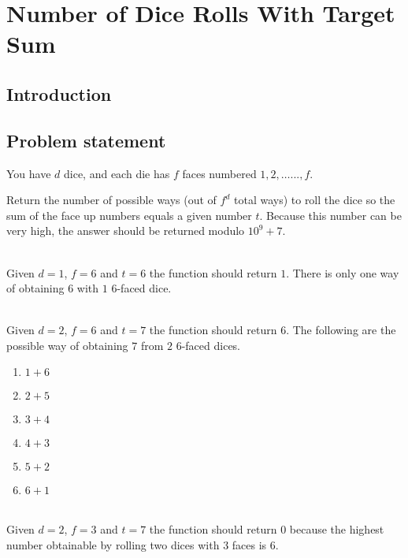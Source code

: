 %

\chapter{Number of Dice Rolls With Target Sum}
\label{ch:dice_rolls}
\section*{Introduction}



\section{Problem statement}
\begin{exercise}
You have $d$ dice, and each die has $f$ faces numbered $1, 2, \ldots..., f$.

Return the number of possible ways (out of $f^d$ total ways) to roll the dice so the sum of the face up numbers equals a given number $t$. Because this number can be very high, the answer should be returned modulo $10^9 + 7$.

	\begin{example}
		\hfill \\
		Given $d=1$, $f=6$ and $t=6$ the function should return $1$. There is only one way of obtaining $6$ with $1$ $6$-faced dice.
	\end{example}

	\begin{example}
		\hfill \\
		Given $d=2$, $f=6$ and $t=7$ the function should return $6$. The following are the possible way of obtaining $7$ from $2$ $6$-faced dices.
		\begin{enumerate}
			\item $1+6$
			\item $2+5$
			\item $3+4$
			\item $4+3$
			\item $5+2$
			\item $6+1$
		\end{enumerate}
		
	\end{example}

	\begin{example}
		\hfill \\
		Given $d=2$, $f=3$ and $t=7$ the function should return $0$ because the highest number obtainable by rolling two dices with $3$ faces is $6$.
	\end{example}
\end{exercise}

